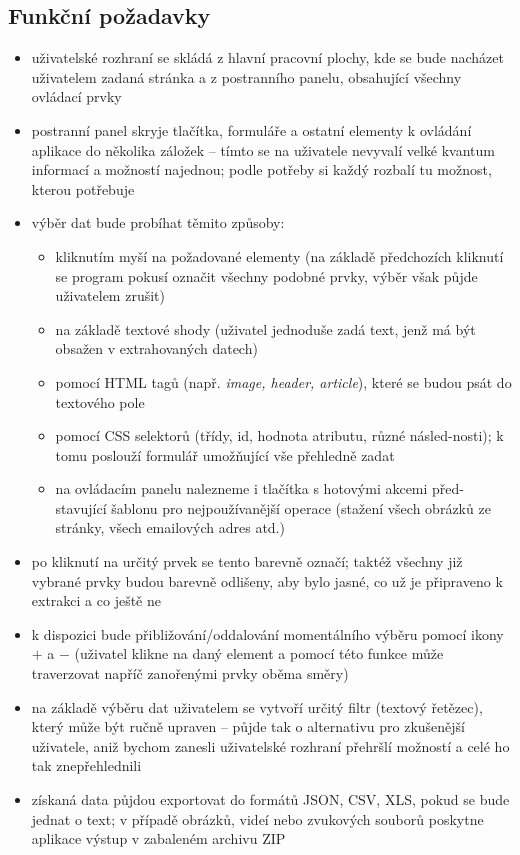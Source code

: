 \documentclass[thesis=B,czech]{FITthesis}[2012/06/26]
\begin{document}
\subsection{Funkční požadavky}
\begin{itemize}
	\item uživatelské rozhraní se skládá z hlavní pracovní plochy, kde se bude nacházet uživatelem zadaná stránka a z postranního panelu, obsahující všechny ovládací prvky
	\item postranní panel skryje tlačítka, formuláře a ostatní elementy k ovládání aplikace do několika záložek -- tímto se na uživatele nevyvalí velké kvantum informací a možností najednou; podle potřeby si každý rozbalí tu možnost, kterou potřebuje
	\item výběr dat bude probíhat těmito způsoby:
	\begin{itemize}
		\item kliknutím myší na požadované elementy (na základě předchozích kliknutí se program pokusí označit všechny podobné prvky, výběr však půjde uživatelem zrušit)
		\item na základě textové shody (uživatel jednoduše zadá text, jenž má být obsažen v extrahovaných datech)
		\item pomocí HTML tagů (např. \emph{image, header, article}), které se budou psát do textového pole
		\item pomocí CSS selektorů (třídy, id, hodnota atributu, různé násled-nosti); k tomu poslouží formulář umožňující vše přehledně zadat
		\item na ovládacím panelu nalezneme i tlačítka s hotovými akcemi před-stavující šablonu pro nejpoužívanější operace (stažení všech obrázků ze stránky, všech emailových adres atd.)
	\end{itemize}
	\item po kliknutí na určitý prvek se tento barevně označí; taktéž všechny již vybrané prvky budou barevně odlišeny, aby bylo jasné, co už je připraveno k extrakci a co ještě ne
	\item k dispozici bude přibližování/oddalování momentálního výběru pomocí ikony $+$ a $-$ (uživatel klikne na daný element a pomocí této funkce může traverzovat napříč zanořenými prvky oběma směry)
	\item na základě výběru dat uživatelem se vytvoří určitý filtr (textový řetězec), který může být ručně upraven -- půjde tak o alternativu pro zkušenější uživatele, aniž bychom zanesli uživatelské rozhraní přehršlí možností a celé ho tak znepřehlednili
	\item získaná data půjdou exportovat do formátů JSON, CSV, XLS, pokud se bude jednat o text; v případě obrázků, videí nebo zvukových souborů poskytne aplikace výstup v zabaleném archivu ZIP
\end{itemize}
\end{document}
